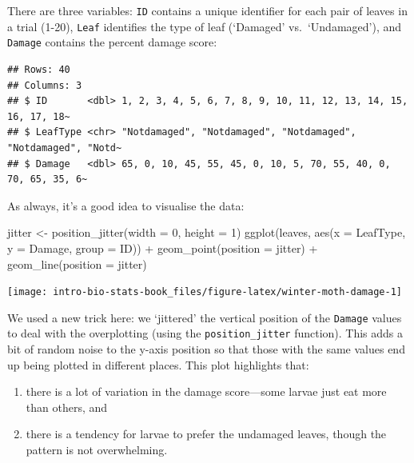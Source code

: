 \documentclass[
]{book}
\newenvironment{Shaded}{\begin{snugshade}}{\end{snugshade}}
\newcommand{\AttributeTok}[1]{\textcolor[rgb]{0.77,0.63,0.00}{#1}}
\newcommand{\DecValTok}[1]{\textcolor[rgb]{0.00,0.00,0.81}{#1}}
\newcommand{\FunctionTok}[1]{\textcolor[rgb]{0.00,0.00,0.00}{#1}}
\newcommand{\NormalTok}[1]{#1}
\newcommand{\OtherTok}[1]{\textcolor[rgb]{0.56,0.35,0.01}{#1}}
\newcommand{\SpecialCharTok}[1]{\textcolor[rgb]{0.00,0.00,0.00}{#1}}
\providecommand{\tightlist}{%
  \setlength{\itemsep}{0pt}\setlength{\parskip}{0pt}}
\begin{document}
There are three variables: \texttt{ID} contains a unique identifier for each pair of leaves in a trial (1-20), \texttt{Leaf} identifies the type of leaf (`Damaged' vs.~`Undamaged'), and \texttt{Damage} contains the percent damage score:

\begin{verbatim}
## Rows: 40
## Columns: 3
## $ ID       <dbl> 1, 2, 3, 4, 5, 6, 7, 8, 9, 10, 11, 12, 13, 14, 15, 16, 17, 18~
## $ LeafType <chr> "Notdamaged", "Notdamaged", "Notdamaged", "Notdamaged", "Notd~
## $ Damage   <dbl> 65, 0, 10, 45, 55, 45, 0, 10, 5, 70, 55, 40, 0, 70, 65, 35, 6~
\end{verbatim}

As always, it's a good idea to visualise the data:

\begin{Shaded}
\begin{Highlighting}[]
\NormalTok{jitter }\OtherTok{\textless{}{-}} \FunctionTok{position\_jitter}\NormalTok{(}\AttributeTok{width =} \DecValTok{0}\NormalTok{, }\AttributeTok{height =} \DecValTok{1}\NormalTok{)}
\FunctionTok{ggplot}\NormalTok{(leaves, }\FunctionTok{aes}\NormalTok{(}\AttributeTok{x =}\NormalTok{ LeafType, }\AttributeTok{y =}\NormalTok{ Damage, }\AttributeTok{group =}\NormalTok{ ID)) }\SpecialCharTok{+}
  \FunctionTok{geom\_point}\NormalTok{(}\AttributeTok{position =}\NormalTok{ jitter) }\SpecialCharTok{+} 
  \FunctionTok{geom\_line}\NormalTok{(}\AttributeTok{position =}\NormalTok{ jitter) }
\end{Highlighting}
\end{Shaded}

\begin{center}\texttt{[image: intro-bio-stats-book\_files/figure-latex/winter-moth-damage-1]} \end{center}

We used a new trick here: we `jittered' the vertical position of the \texttt{Damage} values to deal with the overplotting (using the \texttt{position\_jitter} function). This adds a bit of random noise to the y-axis position so that those with the same values end up being plotted in different places. This plot highlights that:

\begin{enumerate}
\def\labelenumi{\arabic{enumi}.}
\tightlist
\item
  there is a lot of variation in the damage score---some larvae just eat more than others, and
\item
  there is a tendency for larvae to prefer the undamaged leaves, though the pattern is not overwhelming.
\end{enumerate}
\end{document}
